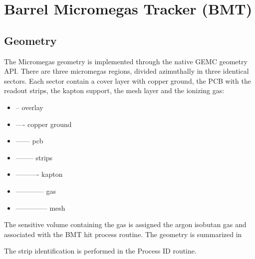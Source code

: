 \section{Barrel Micromegas Tracker (BMT)}

\subsection{Geometry}

The Micromegas geometry is implemented through the native GEMC geometry API.
There are three micromegas regions, divided azimuthally in three identical sectors. Each sector contain a cover layer with copper ground,
the PCB with the readout strips, the kapton support, the mesh layer and the ionizing gas:

\begin{itemize}
	\item -- overlay
	\item ---- copper ground
	\item ------ pcb
	\item -------- strips
	\item ---------- kapton
	\item ------------ gas
	\item -------------- mesh
\end{itemize}

The sensitive volume containing the gas is assigned the argon isobutan gas and associated with the BMT hit process routine.
The geometry is summarized in 

The strip identification is performed in the Process ID routine.

